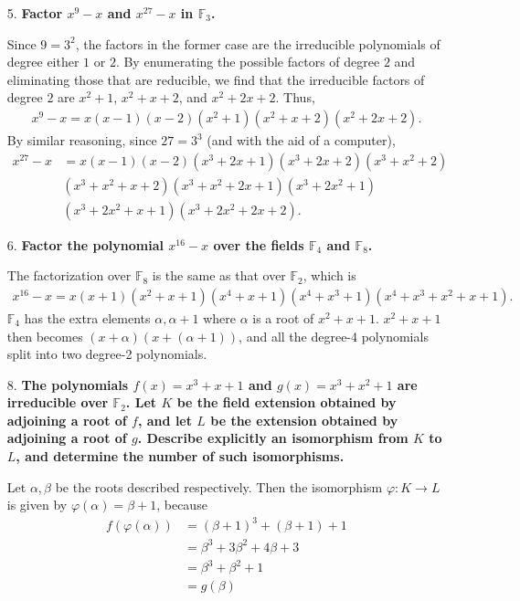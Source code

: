 \documentclass[a4paper,12pt]{article}
\begin{document}
\begin{enumerate}
    \item[5.]
        \boldmath
        \textbf{Factor $x^9 - x$ and $x^{27} - x$ in $\mathbb{F}_3$.} \par
        \unboldmath
        Since $9 = 3^2$, the factors in the former case are the irreducible polynomials of degree either $1$ or $2$. By enumerating the possible factors of degree $2$ and eliminating those that are reducible, we find that the irreducible factors of degree $2$ are $x^2 + 1$, $x^2 + x + 2$, and $x^2 + 2x + 2$. Thus,
        \begin{align*}
            x^9 - x = x(x - 1)(x - 2)(x^2 + 1)(x^2 + x + 2)(x^2 + 2x + 2).
        \end{align*}
        By similar reasoning, since $27 = 3^3$ (and with the aid of a computer),
        \begin{align*}
            x^{27} - x &= x(x - 1)(x - 2)(x^3 + 2x + 1)(x^3 + 2x + 2)(x^3 + x^2 + 2) \\
            &(x^3 + x^2 + x + 2)(x^3 + x^2 + 2x + 1)(x^3 + 2x^2 + 1) \\
            &(x^3 + 2x^2 + x + 1)(x^3 + 2x^2 + 2x + 2).
        \end{align*}

    \item[6.]
        \boldmath
        \textbf{Factor the polynomial $x^{16} - x$ over the fields $\mathbb{F}_4$ and $\mathbb{F}_8$.} \par
        \unboldmath
        The factorization over $\mathbb{F}_8$ is the same as that over $\mathbb{F}_2$, which is
        \begin{align*}
            x^{16} - x = x(x + 1)(x^2 + x + 1)(x^4 + x + 1)(x^4 + x^3 + 1)(x^4 + x^3 + x^2 + x + 1).
        \end{align*}
        $\mathbb{F}_4$ has the extra elements $\alpha, \alpha + 1$ where $\alpha$ is a root of $x^2 + x + 1$. $x^2 + x + 1$ then becomes $(x + \alpha)(x + (\alpha + 1))$, and all the degree-4 polynomials split into two degree-2 polynomials.

    \item[8.]
        \boldmath
        \textbf{The polynomials $f(x) = x^3 + x + 1$ and $g(x) = x^3 + x^2 + 1$ are irreducible over $\mathbb{F}_2$. Let $K$ be the field extension obtained by adjoining a root of $f$, and let $L$ be the extension obtained by adjoining a root of $g$. Describe explicitly an isomorphism from $K$ to $L$, and determine the number of such isomorphisms.} \par
        \unboldmath
        Let $\alpha, \beta$ be the roots described respectively. Then the isomorphism $\varphi : K \to L$ is given by $\varphi(\alpha) = \beta + 1$, because
        \begin{align*}
            f(\varphi(\alpha)) &= (\beta + 1)^3 + (\beta + 1) + 1 \\
            &= \beta^3 + 3\beta^2 + 4\beta + 3 \\
            &= \beta^3 + \beta^2 + 1 \\
            &= g(\beta)
        \end{align*}
\end{enumerate}
\end{document}
